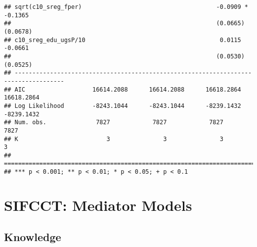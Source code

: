 \documentclass[
]{article}
\begin{document}
\begin{verbatim}
## sqrt(c10_sreg_fper)                                      -0.0909 *       -0.1365    
##                                                          (0.0665)        (0.0678)   
## c10_sreg_edu_ugsP/10                                      0.0115         -0.0661    
##                                                          (0.0530)        (0.0525)   
## ------------------------------------------------------------------------------------
## AIC                   16614.2088      16614.2088      16618.2864      16618.2864    
## Log Likelihood        -8243.1044      -8243.1044      -8239.1432      -8239.1432    
## Num. obs.              7827            7827            7827            7827         
## K                         3               3               3               3         
## ====================================================================================
## *** p < 0.001; ** p < 0.01; * p < 0.05; + p < 0.1
\end{verbatim}

\hypertarget{sifcct-mediator-models}{%
\section{SIFCCT: Mediator Models}\label{sifcct-mediator-models}}

\hypertarget{knowledge}{%
\subsection{Knowledge}\label{knowledge}}
\end{document}
